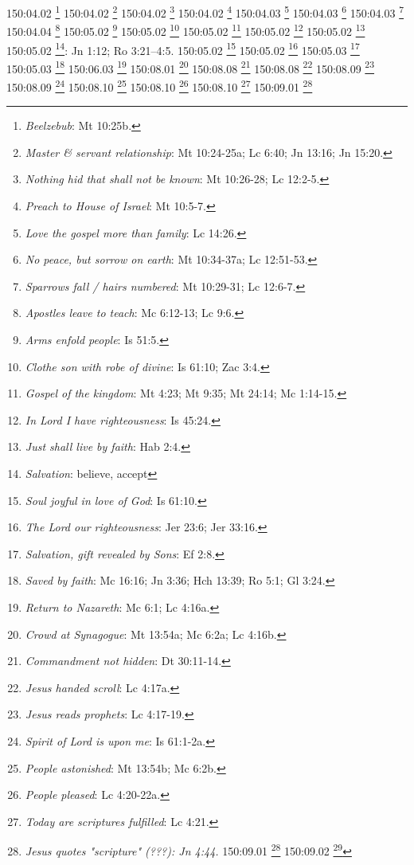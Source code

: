 {{{{{{{{{{{{{{{{{{{{{{{{{{150:04.02 \footnote{\textit{Beelzebub}: Mt 10:25b.}
150:04.02 \footnote{\textit{Master & servant relationship}: Mt 10:24-25a; Lc 6:40; Jn 13:16; Jn 15:20.}
150:04.02 \footnote{\textit{Nothing hid that shall not be known}: Mt 10:26-28; Lc 12:2-5.}
150:04.02 \footnote{\textit{Preach to House of Israel}: Mt 10:5-7.}
150:04.03 \footnote{\textit{Love the gospel more than family}: Lc 14:26.}
150:04.03 \footnote{\textit{No peace, but sorrow on earth}: Mt 10:34-37a; Lc 12:51-53.}
150:04.03 \footnote{\textit{Sparrows fall / hairs numbered}: Mt 10:29-31; Lc 12:6-7.}
150:04.04 \footnote{\textit{Apostles leave to teach}: Mc 6:12-13; Lc 9:6.}
150:05.02 \footnote{\textit{Arms enfold people}: Is 51:5.}
150:05.02 \footnote{\textit{Clothe son with robe of divine}: Is 61:10; Zac 3:4.}
150:05.02 \footnote{\textit{Gospel of the kingdom}: Mt 4:23; Mt 9:35; Mt 24:14; Mc 1:14-15.}
150:05.02 \footnote{\textit{In Lord I have righteousness}: Is 45:24.}
150:05.02 \footnote{\textit{Just shall live by faith}: Hab 2:4.}
150:05.02 \footnote{\textit{Salvation}: believe, accept}: Jn 1:12; Ro 3:21--4:5.}
150:05.02 \footnote{\textit{Soul joyful in love of God}: Is 61:10.}
150:05.02 \footnote{\textit{The Lord our righteousness}: Jer 23:6; Jer 33:16.}
150:05.03 \footnote{\textit{Salvation, gift revealed by Sons}: Ef 2:8.}
150:05.03 \footnote{\textit{Saved by faith}: Mc 16:16; Jn 3:36; Hch 13:39; Ro 5:1; Gl 3:24.}
150:06.03 \footnote{\textit{Return to Nazareth}: Mc 6:1; Lc 4:16a.}
150:08.01 \footnote{\textit{Crowd at Synagogue}: Mt 13:54a; Mc 6:2a; Lc 4:16b.}
150:08.08 \footnote{\textit{Commandment not hidden}: Dt 30:11-14.}
150:08.08 \footnote{\textit{Jesus handed scroll}: Lc 4:17a.}
150:08.09 \footnote{\textit{Jesus reads prophets}: Lc 4:17-19.}
150:08.09 \footnote{\textit{Spirit of Lord is upon me}: Is 61:1-2a.}
150:08.10 \footnote{\textit{People astonished}: Mt 13:54b; Mc 6:2b.}
150:08.10 \footnote{\textit{People pleased}: Lc 4:20-22a.}
150:08.10 \footnote{\textit{Today are scriptures fulfilled}: Lc 4:21.}
150:09.01 \footnote{\textit{Jesus quotes "scripture" (???): Jn 4:44.}
150:09.01 \footnote{\textit{Opposition grows}: Mt 13:55-57; Mc 6:3-4; Lc 4:22b-24.}
150:09.02 \footnote{\textit{No "miracles": Mt 13:58; Mc 6:5-6.}
150:09.03 \footnote{\textit{Jesus escapes mob}: Lc 4:28-30.}
150:09.03 \footnote{\textit{Soft answer vs. wrath}: Pr 15:1.}
150:09.04 \footnote{\textit{Return to Capernaum}: Lc 4:31.}
151:01.01 \footnote{\textit{Crowd around boat}: Mt 13:1-3; Mc 4:1-2; Lc 8:4.}
151:01.02 \footnote{\textit{Parable of sower}: Mt 13:3b-9; Mc 4:3-9; Lc 8:5-8.}
151:01.03 \footnote{\textit{Disciples ask meaning}: Mt 13:10; Mc 4:10; Lc 8:9.}
}}}}}}}}}}}}}}}}}}}}}}}}}}}
